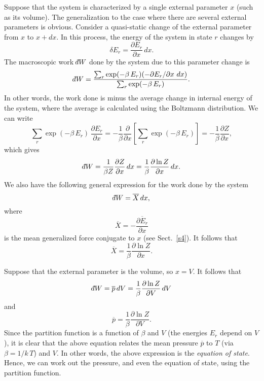 Suppose that the system is characterized by a single external parameter 
$x$ (such as
its volume). The generalization to the case where there are several external
parameters is obvious. Consider a quasi-static change of the external parameter
from $x$ to $x+ dx$. In this process, the energy of the system in state $r$ changes
by
\begin{equation}
\delta E_r = \frac{\partial E_r}{\partial x} \, dx.
\end{equation}
The macroscopic work \/$\dbar W$ done  by the system due to this parameter
change is
\begin{equation}
\dbar W = \frac{ \sum_r \exp(-\beta \,E_r) (-\partial E_r/\partial x\,\, dx)}
{\sum_r \exp(-\beta \,E_r)}.
\end{equation}
In other words, the work done is minus the average  change in internal
energy of  the system, where the
average  is calculated using the Boltzmann distribution. We can write
\begin{equation}\label{e7.45}
\sum_r \exp(-\beta \,E_r)\,\frac{\partial E_r}{\partial x} = -\frac{1}{\beta}
\frac{\partial}{\partial x}\!\left[\sum_r \exp(-\beta \,E_r)\right] = -\frac{1}{\beta}
\frac{\partial Z}{\partial x},
\end{equation}
which gives
\begin{equation}\label{e7.41t}
\dbar W = \frac{1}{\beta Z}\frac{\partial Z}{\partial x}\,dx = \frac{1}{\beta}
\frac{\partial \ln Z}{\partial x}\,dx.
\end{equation}
We also have the following general expression for the work done by the system
\begin{equation}
\dbar W = \overline{X}\,dx,
\end{equation}
where
\begin{equation}
\overline{X} = - \overline{\frac{\partial E_r}{\partial x}}
\end{equation}
is the mean generalized force conjugate to $x$ (see Sect.~\ref{s4}). It follows that 
\begin{equation}
\overline{X} = \frac{1}{\beta} \frac{\partial \ln Z}{\partial x}.
\end{equation}


Suppose that  the external parameter is the volume, so $x=V$. It follows that
\begin{equation}
\dbar W = \overline{p} \,dV = \frac{1}{\beta} \frac{\partial \ln Z}{\partial V}
\,dV
\end{equation}
and
\begin{equation}\label{e7.50}
\overline{p} = \frac{1}{\beta} \frac{\partial \ln Z}{\partial V}.
\end{equation}
Since the partition function is a function of $\beta$ and $V$ (the energies
$E_r$ depend on $V$), it is clear that the above equation relates 
the mean pressure $\overline{p}$ to $T$
(via $\beta = 1/k\,T$)  and $V$. In other words, the above expression
is the {\em equation
of state}. Hence, we can work out the pressure, and even the equation of state,
using the partition function. 

